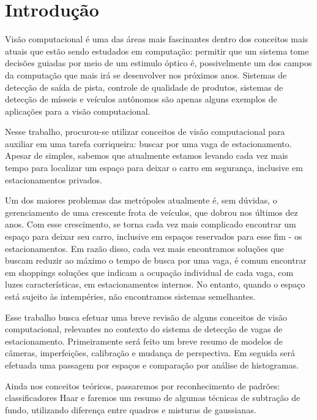 \documentclass[ecp,tc]{iiufrgs}
\begin{document}
\listoffigures

\listoftables

\tableofcontents


\chapter{Introdução}
Visão computacional é uma das áreas mais fascinantes dentro dos conceitos mais atuais que estão sendo estudados em computação: permitir que um sistema tome decisões guiadas por meio de um estimulo óptico é, possivelmente um dos campos da computação que mais irá se desenvolver nos próximos anos. Sistemas de detecção de saída de pista, controle de qualidade de produtos, sistemas de detecção de mísseis e veículos autônomos são apenas alguns exemplos de aplicações para a visão computacional.

Nesse trabalho, procurou-se utilizar conceitos de visão computacional para auxiliar em uma tarefa corriqueira: buscar por uma vaga de estacionamento. Apesar de simples, sabemos que atualmente estamos levando cada vez mais tempo para localizar um espaço para deixar o carro em segurança, inclusive em estacionamentos privados.



Um dos maiores problemas das metrópoles atualmente é, sem dúvidas, o gerenciamento de uma crescente frota de veículos, que dobrou nos últimos dez anos. Com esse crescimento, se torna cada vez mais complicado encontrar um espaço para deixar seu carro, inclusive em espaços reservados para esse fim - os estacionamentos. Em razão disso, cada vez mais encontramos soluções que buscam reduzir ao máximo o tempo de busca por uma vaga, é comum encontrar em shoppings soluções que indicam a ocupação individual de cada vaga, com luzes características, em estacionamentos internos. No entanto, quando o espaço está sujeito às intempéries, não encontramos sistemas semelhantes.

Esse trabalho busca efetuar uma breve revisão de alguns conceitos de visão computacional, relevantes no contexto do sistema de detecção de vagas de estacionamento. Primeiramente será feito um breve resumo de modelos de câmeras, imperfeições, calibração e mudança de perspectiva. Em seguida será efetuada uma passagem por espaços e comparação por análise de histogramas.

Ainda nos conceitos teóricos, passaremos por reconhecimento de padrões: classificadores Haar e faremos um resumo de algumas técnicas de subtração de fundo, utilizando diferença entre quadros e misturas de gaussianas.
\end{document}

